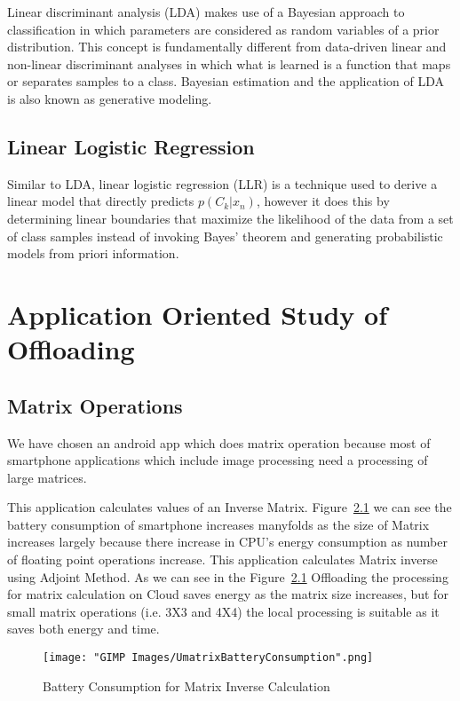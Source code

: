 \documentclass{report}
\begin{document}
Linear discriminant analysis (LDA) makes use of a Bayesian approach to classification in which parameters are considered as random variables of a prior distribution. This concept is fundamentally different from data-driven linear and non-linear discriminant analyses in which what is learned is a function that maps or separates samples to a class. Bayesian estimation and the application of LDA is also known as generative modeling.

\section{Linear Logistic Regression}
Similar to LDA, linear logistic regression (LLR) is a technique used to derive a linear
model that directly predicts $p(C_k |x_n ) $, however it does this by determining linear
boundaries that maximize the likelihood of the data from a set of class samples instead of
invoking Bayes’ theorem and generating probabilistic models from priori information.


\chapter{Application Oriented Study of Offloading}
\label{chap:applicationorientedstudy}

\section{Matrix Operations}
We have chosen an android app which does matrix operation because most of smartphone applications which include image processing  need a processing of large matrices.

This application calculates values of an Inverse Matrix. Figure~\ref{fig:UmatrixBatteryConsumption} we can see the battery consumption
of smartphone increases manyfolds as the size of Matrix increases largely because there increase in CPU's energy consumption as number of floating point operations increase. This application calculates Matrix inverse using Adjoint Method. As we can see in the Figure~\ref{fig:UmatrixBatteryConsumption} Offloading the processing for matrix calculation on Cloud saves energy as the matrix size increases, but for small matrix operations (i.e. 3X3 and 4X4) the local processing is suitable as it saves both energy and time.

\begin{figure}[h]
  \centering
  \texttt{[image: "GIMP Images/UmatrixBatteryConsumption".png]}
  \caption{Battery Consumption for Matrix Inverse Calculation}
  \label{fig:UmatrixBatteryConsumption}
\end{figure}
\end{document}
